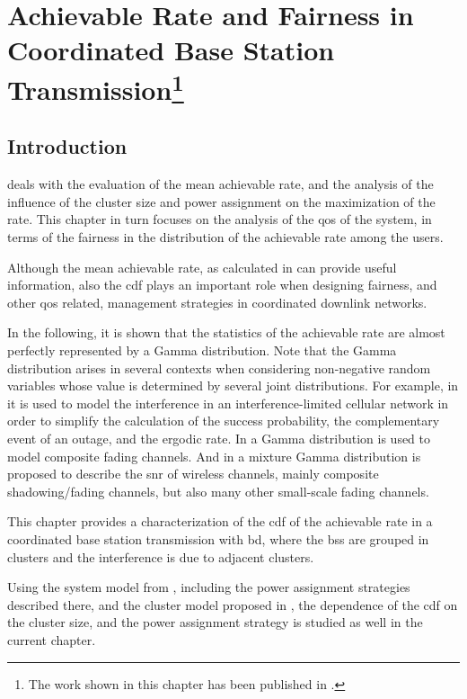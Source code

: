 \chapter[Rate Statistics]{Achievable Rate and Fairness in Coordinated Base
Station Transmission\footnote{The work shown in this chapter has been published
in \cite{corvaja14}.}}\label{ch:rate_statistics}

\section{Introduction}\label{sec:stats_intro}

 deals with the evaluation of the mean achievable rate,
and the analysis of the influence of the cluster size and power assignment on
the maximization of the rate. This chapter in turn focuses on the analysis of
the \gls{qos} of the system, in terms of the fairness in the distribution of the
achievable rate among the users.

Although the mean achievable rate, as calculated in  can
provide useful information, also the \gls{cdf} plays an important role when
designing fairness, and other \gls{qos} related, management strategies in
coordinated downlink networks.

In the following, it is shown that the statistics of the achievable rate are
almost perfectly represented by a Gamma distribution. Note that the Gamma
distribution arises in several contexts when considering non-negative random
variables whose value is determined by several joint distributions. For example,
in \cite{heath13} it is used to model the interference in an
interference-limited cellular network in order to simplify the calculation of
the success probability, \ie the complementary event of an outage, and
the ergodic rate. In \cite{alahmadi10} a Gamma distribution is used to model
composite fading channels. And in \cite{atapattu11} a mixture Gamma distribution
is proposed to describe the \gls{snr} of wireless channels, mainly composite
shadowing/fading channels, but also many other small-scale fading channels.

This chapter provides a characterization of the \gls{cdf} of the achievable rate
in a coordinated base station transmission with \gls{bd}, where the \glspl{bs}
are grouped in clusters and the interference is due to adjacent clusters.

Using the system model from , including the power
assignment strategies described there, and the cluster model proposed in
, the dependence of the \gls{cdf} on the cluster
size, and the power assignment strategy is studied as well in the current
chapter.

